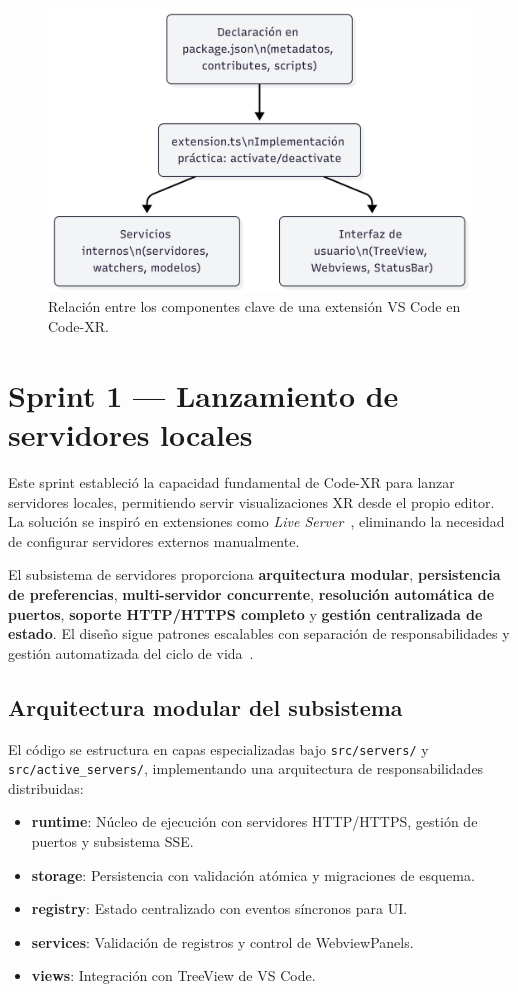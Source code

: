 \documentclass[a4paper, 12pt]{book}
\begin{document}
\begin{figure}[H]
\centering
\includegraphics[width=0.60\linewidth]{img/fig-extension-structure.png}
\caption{Relación entre los componentes clave de una extensión VS Code en Code-XR.}
\label{fig:extension-structure}
\end{figure}


\section{Sprint 1 — Lanzamiento de servidores locales}
\label{sec:sprint-servers}

Este sprint estableció la capacidad fundamental de Code-XR para lanzar servidores locales, permitiendo servir visualizaciones XR desde el propio editor. La solución se inspiró en extensiones como \emph{Live Server}~\cite{liveserver}, eliminando la necesidad de configurar servidores externos manualmente.

El subsistema de servidores proporciona \textbf{arquitectura modular}, \textbf{persistencia de preferencias}, \textbf{multi-servidor concurrente}, \textbf{resolución automática de puertos}, \textbf{soporte HTTP/HTTPS completo} y \textbf{gestión centralizada de estado}. El diseño sigue patrones escalables con separación de responsabilidades y gestión automatizada del ciclo de vida~\cite{code-xr}.

\subsection{Arquitectura modular del subsistema}
El código se estructura en capas especializadas bajo \texttt{src/servers/} y \texttt{src/active\_servers/}, implementando una arquitectura de responsabilidades distribuidas:

\begin{itemize}
  \item \textbf{runtime}: Núcleo de ejecución con servidores HTTP/HTTPS, gestión de puertos y subsistema SSE.
  \item \textbf{storage}: Persistencia con validación atómica y migraciones de esquema.
  \item \textbf{registry}: Estado centralizado con eventos síncronos para UI.
  \item \textbf{services}: Validación de registros y control de WebviewPanels.
  \item \textbf{views}: Integración con TreeView de VS Code.
\end{itemize}
\end{document}
